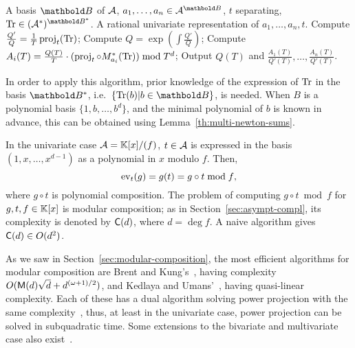 \begin{algorithm}
  \caption{}
  \label{alg:rur}
  \begin{algorithmic}[1]
    \REQUIRE A basis $\basis{B}$ of
      $\mathcal{A}$, $a_1,\ldots,a_n\in\algeb{A}^{\basis{B}}$, $t$
    separating, $\Tr\in(\dual{\algeb{A}})^{\dual{\basis{B}}}$.
    \ENSURE A rational univariate representation of $a_1,\ldots,a_n,t$.
    \STATE \label{alg:rur:1}Compute $\frac{Q'}{Q} = \frac{1}{T}\operatorname{proj}_t(\operatorname{Tr})$;
    \STATE \label{alg:rur:2}Compute $Q = \exp\left(\int \frac{Q'}{Q}\right)$;
    \STATE \label{alg:rur:4}Compute $A_i(T)=\frac{Q(T)}{T}\cdot(\operatorname{proj}_t\circ M_{a_i}^\ast(\operatorname{Tr})) \bmod T^d$;
    \ENDFOR
    \STATE \label{alg:rur:5}Output $Q(T)$ and $\frac{A_1(T)}{Q'(T)},\ldots,\frac{A_n(T)}{Q'(T)}$.
  \end{algorithmic}
\end{algorithm}

In order to apply this algorithm, prior knowledge of the expression of
$\operatorname{Tr}$ in the basis $\dual{\basis{B}}$, i.e.\ $\{\Tr(b) |
b\in\basis{B}\}$, is needed. When $B$ is a polynomial basis
$\{1,b,\ldots,b^d\}$, and the minimal polynomial of $b$ is known in
advance, this can be obtained using Lemma~\ref{th:multi-newton-sums}.

\begin{remark}
  In the univariate case $\mathcal{A}=\mathbb{K}[x]/(f)$, $t\in\mathcal{A}$ is
  expressed in the basis $(1,x,\ldots,x^{d-1})$ as a polynomial in $x$
  modulo $f$. Then,
  \[\operatorname{ev}_t(g) = g(t) = g\circ t \bmod f\text{,}\]
  where $g\circ t$ is polynomial composition. The problem of computing
  $g\circ t\bmod f$ for $g,t,f\in\mathbb{K}[x]$ is modular composition; as in
  Section~\ref{sec:asympt-compl}, its complexity is denoted by
  $\mathsf{C}(d)$, where $d=\deg f$. A naive algorithm gives
  $\mathsf{C}(d)\in O(d^2)$.
  
  As we saw in Section~\ref{sec:modular-composition}, the most
  efficient algorithms for modular composition are Brent and
  Kung's~\cite{brent+kung}, having complexity $O(\mathsf{M}(d)\sqrt{d} +
  d^{(\omega+1)/2})$, and Kedlaya and
  Umans'~\cite{umans:08,kedlaya+umans08}, having quasi-linear
  complexity. Each of these has a dual algorithm solving power
  projection with the same complexity~\cite{shoup94,kedlaya+umans08},
  thus, at least in the univariate case, power projection can be
  solved in subquadratic time.  Some extensions to the bivariate and
  multivariate case also exist~\cite{shoup99,kedlaya+umans08}.
\end{remark}

